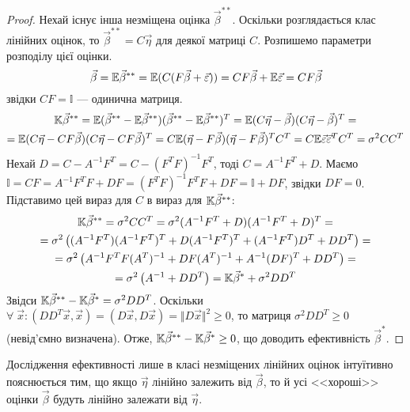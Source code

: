\begin{proof}
    Нехай існує інша незміщена оцінка $\vec{\beta}^{**}$. Оскільки розглядається клас лінійних оцінок, то
    $\vec{\beta}^{**} = C\vec{\eta}$ для деякої матриці $C$. Розпишемо параметри розподілу цієї оцінки.
    $$\vec{\beta} = \mathbb{E}\vec{\beta}^{**} = \mathbb{E} ( C (F \vec{\beta} + \vec{\varepsilon})) = 
    C F \vec{\beta} + \mathbb{E}\vec{\varepsilon} = C F \vec{\beta}$$ звідки $CF = \mathbb{I}$ --- одинична матриця.
    \begin{gather*}
        \mathbb{K} \vec{\beta}^{**} = \mathbb{E}(\vec{\beta}^{**} - \mathbb{E}\vec{\beta}^{**})(\vec{\beta}^{**} - \mathbb{E}\vec{\beta}^{**})^T = 
        \mathbb{E} (C\vec{\eta} - \vec{\beta})(C\vec{\eta} - \vec{\beta})^T = \\
        = \mathbb{E} (C\vec{\eta} - C F\vec{\beta})(C\vec{\eta} - C F\vec{\beta})^T = 
        C \mathbb{E} (\vec{\eta} - F\vec{\beta})(\vec{\eta} - F\vec{\beta})^T C^T = 
        C \mathbb{E} \vec{\varepsilon}\vec{\varepsilon}^T C^T = \sigma^2 C C^T
    \end{gather*}
    Нехай $D = C - A^{-1}F^T = C - (F^T F)^{-1} F^T$, тоді $C = A^{-1}F^T + D$.
    Маємо $\mathbb{I} = C F = A^{-1}F^T F + D F = (F^T F)^{-1} F^T F + D F = \mathbb{I} + DF$,
    звідки $D F = 0$. Підставимо цей вираз для $C$ в вираз для $\mathbb{K} \vec{\beta}^{**}$:
    \begin{gather*}
        \mathbb{K} \vec{\beta}^{**} = \sigma^2 C C^T = \sigma^2 (A^{-1}F^T + D)(A^{-1}F^T + D)^T = \\ =
        \sigma^2 \left(
            (A^{-1}F^T)(A^{-1}F^T)^T + D (A^{-1}F^T)^T + (A^{-1}F^T)D^T + D D^T
        \right) = \\ =
        \sigma^2 \left(
            A^{-1}F^T F (A^T)^{-1} + D F (A^T)^{-1} + A^{-1} (DF)^T + D D^T
        \right) = \\ =
        \sigma^2 \left(
            A^{-1} + D D^T
        \right) = \mathbb{K} \vec{\beta}^* + \sigma^2 D D^T
    \end{gather*}
    Звідси $\mathbb{K} \vec{\beta}^{**} - \mathbb{K} \vec{\beta}^* = \sigma^2 D D^T$. Оскільки
    $\forall \; \vec{x} : \left(D D^T \vec{x}, \vec{x}\right) = \left(D\vec{x}, D\vec{x}\right) = 
    \Vert D \vec{x} \Vert^2 \geq 0$, то матриця $\sigma^2 D D^T \geq 0$ (невід'ємно визначена).
    Отже, $\mathbb{K} \vec{\beta}^{**} - \mathbb{K} \vec{\beta}^* \geq 0$, що доводить ефективність $\vec{\beta}^*$.
\end{proof}
\begin{remark}
    Дослідження ефективності лише в класі незміщених лінійних оцінок інтуїтивно пояснюється тим, що якщо $\vec{\eta}$ лінійно залежить від $\vec{\beta}$,
    то й усі <<хороші>> оцінки $\vec{\beta}$ будуть лінійно залежати від $\vec{\eta}$.
\end{remark}
